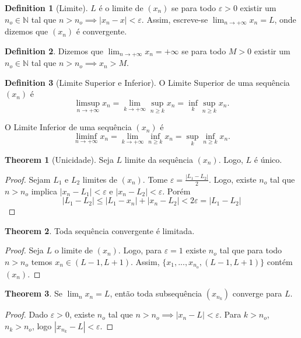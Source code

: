 \documentclass[10pt]{article}
\theoremstyle{definition}
\newtheorem{definition}{Definition}[section]
\newtheorem{theorem}{Theorem}
\begin{document}
\begin{definition}[Limite]
	$L$ é o limite de $(x_n)$ se para todo $\varepsilon > 0$ existir um
	$n_o \in \mathbb N$ tal que $n>n_o \implies |x_n - x| < \varepsilon$.
	Assim, escreve-se $\lim_{n\to +\infty} x_n = L$, onde dizemos que
	$(x_n)$ é convergente.
\end{definition}

\begin{definition}
	Dizemos que $\lim_{n \to +\infty} x_n = +\infty$ se
	para todo $M > 0$ existir um $n_o \in \mathbb N$ tal que
	$n > n_o \implies x_n > M$.
\end{definition}

\begin{definition}[Limite Superior e Inferior]
	O Limite Superior de uma sequência $(x_n)$ é
	\begin{equation}
	\limsup_{n\to +\infty} x_n= \lim_{k\to +\infty} \sup_{n\geq k} x_n = \inf_k \sup_{n \geq k} x_n.
	\end{equation}

	O Limite Inferior de uma sequência $(x_n)$ é
	\begin{equation}
	\liminf_{n\to +\infty} x_n= \lim_{k\to +\infty} \inf_{n\geq k} x_n = \sup_k \inf_{n \geq k} x_n.
	\end{equation}
\end{definition}

\begin{theorem}[Unicidade]
	Seja $L$ limite da sequência $(x_n)$. Logo, $L$ é único.
\end{theorem}
\begin{proof}
	Sejam $L_1$ e $L_2$ limites de $(x_n)$. Tome $\varepsilon = \frac{|L_1-L_2|}{2}$.
	Logo, existe $n_o$ tal que $n>n_o$ implica $|x_n - L_1|<\varepsilon$ e
	$|x_n - L_2|<\varepsilon$. Porém
	\begin{equation}
		|L_1-L_2|\leq |L_1 - x_n| + |x_n - L_2| < 2\varepsilon = |L_1 - L_2|
	\end{equation}
\end{proof}
\begin{theorem}
	Toda sequência convergente é limitada.	
\end{theorem}
\begin{proof}
	Seja $L$ o limite de $(x_n)$. Logo, para $\varepsilon = 1$ existe
	$n_o$ tal que para todo $n > n_o$ temos $x_n \in (L-1,L+1)$.
	Assim, $\{x_1,...,x_{n_o},(L-1,L+1)\}$ contém $(x_n)$.
\end{proof}
\begin{theorem}
	Se $\lim_n x_n = L$, então toda subsequência $(x_{n_k})$ converge para $L$.
\end{theorem}
\begin{proof}
	Dado $\varepsilon > 0$, existe $n_o$ tal que $n>n_o \implies
	|x_n - L| < \varepsilon$. Para $k>n_o$, $n_k > n_o$, logo
	$|x_{n_k} - L| < \varepsilon$.
\end{proof}
\end{document}
